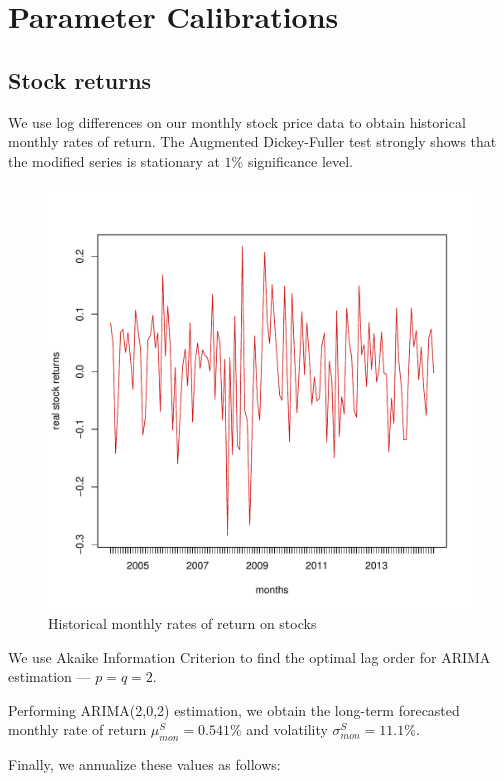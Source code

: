 \chapter{Parameter Calibrations}
\label{paramcalib}

\section{Stock returns}
\label{paramcalibx}
We use log differences on our monthly stock price data to obtain historical monthly rates of return. The Augmented Dickey-Fuller test strongly shows that the modified series is stationary at $1\%$ significance level.

\begin{figure}[h!]
	\centering
	\includegraphics[scale=0.3]{figs/bistdiff.pdf}
	\caption{Historical monthly rates of return on stocks}
	\label{fig:bistdiff}
\end{figure}

We use Akaike Information Criterion to find the optimal lag order for ARIMA estimation --- $p=q=2$.

Performing ARIMA(2,0,2) estimation, we obtain the long-term forecasted monthly rate of return $\mu^S_{mon} = 0.541\%$ and volatility $\sigma^S_{mon} = 11.1\%$.

Finally, we annualize these values as follows:

